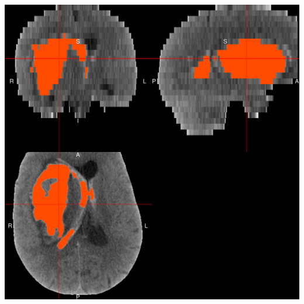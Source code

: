 \documentclass{elsarticle_nonatbib}\usepackage[]{graphicx}\usepackage[]{color}
\makeatletter
\def\maxwidth{ %
  \ifdim\Gin@nat@width>\linewidth
    \linewidth
  \else
    \Gin@nat@width
  \fi
}
\newenvironment{knitrout}{}{} %
\makeatother
\begin{document}
\begin{knitrout}
\color{fgcolor}
\includegraphics[width=\maxwidth]{figure/plotting_dice_over_manu-1} 

\end{knitrout}



\end{document}
